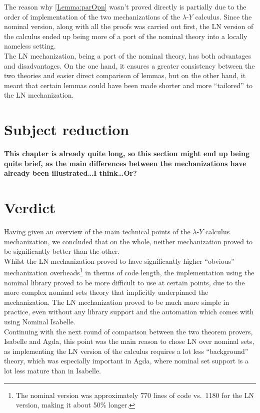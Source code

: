 \documentclass[a4paper, 12pt, twoside]{style/ociamthesis}
\theoremstyle{plain}
\theoremstyle{definition}
\theoremstyle{remark}
\newcommand{\lamy}{\lambda\text{-}Y}
\begin{document}
The reason why \cref{Lemma:parOpn} wasn't proved directly is partially
due to the order of implementation of the two mechanizations of the
\(\lamy\) calculus. Since the nominal version, along with all the proofs
was carried out first, the LN version of the calculus ended up being
more of a port of the nominal theory into a locally nameless setting.\\
The LN mechanization, being a port of the nominal theory, has both
advantages and disadvantages. On the one hand, it ensures a greater
consistency between the two theories and easier direct comparison of
lemmas, but on the other hand, it meant that certain lemmas could have
been made shorter and more ``tailored'' to the LN mechanization.

\section{Subject reduction}\label{subject-reduction}

\textbf{This chapter is already quite long, so this section might end up
being quite brief, as the main differences between the mechanizations
have already been illustrated\ldots{}I think\ldots{}Or?}

\section{Verdict}\label{verdict}

Having given an overview of the main technical points of the \(\lamy\)
calculus mechanization, we concluded that on the whole, neither
mechanization proved to be significantly better than the other.\\
Whilst the LN mechanization proved to have significantly higher
``obvious'' mechanization overheads\footnote{The nominal version was
  approximately 770 lines of code vs.~1180 for the LN version, making it
  about 50\% longer.} in therms of code length, the implementation using
the nominal library proved to be more difficult to use at certain
points, due to the more complex nominal sets theory that implicitly
underpinned the mechanization. The LN mechanization proved to be much
more simple in practice, even without any library support and the
automation which comes with using Nominal Isabelle.\\
Continuing with the next round of comparison between the two theorem
provers, Isabelle and Agda, this point was the main reason to chose LN
over nominal sets, as implementing the LN version of the calculus
requires a lot less ``background'' theory, which was especially
important in Agda, where nominal set support is a lot less mature than
in Isabelle.
\end{document}
